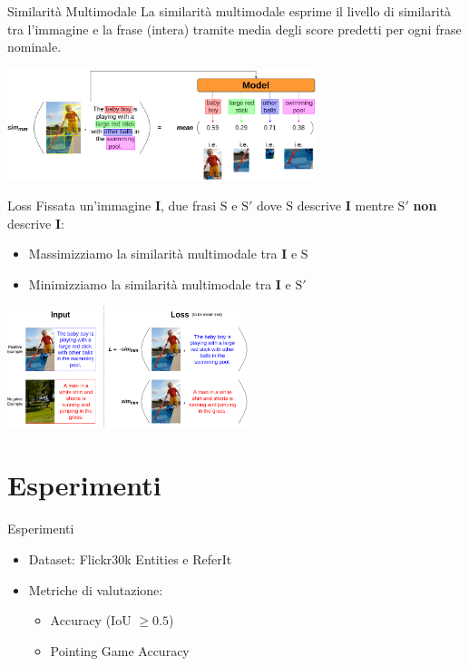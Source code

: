 \documentclass{beamer}
\begin{document}
\begin{frame}{Similarità Multimodale}
  La similarità multimodale esprime il \alert{livello di similarità
  tra l'immagine e la frase (intera)} tramite media degli score
  predetti per ogni frase nominale.
  
  \vspace{1cm}

  \centering
  \includegraphics[width=9cm]{images/sim-mm.png}
\end{frame}

\begin{frame}{Loss}
  Fissata un'immagine $\bm{I}$, due frasi $\text{S}$ e $\text{S}'$
  dove $\text{S}$ descrive $\bm{I}$ mentre $\text{S}'$ \textbf{non}
  descrive $\bm{I}$:
  \begin{itemize}
    \item \alert{Massimizziamo} la similarità multimodale tra $\bm{I}$
    e $\text{S}$
    \item \alert{Minimizziamo} la similarità multimodale tra $\bm{I}$
    e $\text{S}'$
  \end{itemize}
  
  \vspace{0.5cm}

  \centering
  \includegraphics[width=7cm]{images/loss.png}
\end{frame}

\section{Esperimenti}

\begin{frame}{Esperimenti}
  \begin{itemize}
    \item Dataset: \alert{Flickr30k Entities} e \alert{ReferIt}
    \item Metriche di valutazione:
    \begin{itemize}
      \item \alert{Accuracy} (IoU $\geq 0.5$)
      \item Pointing Game Accuracy
    \end{itemize}
  \end{itemize}
\end{frame}
\end{document}
